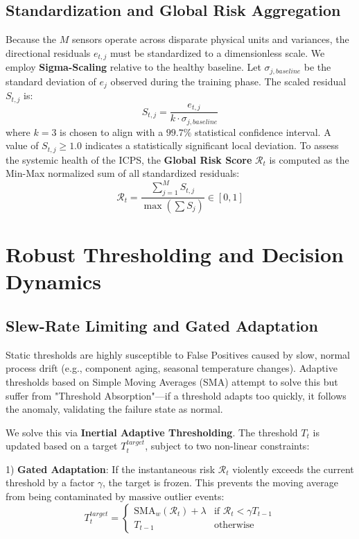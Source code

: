 \documentclass[journal]{IEEEtran}
\begin{document}
	\subsection{Standardization and Global Risk Aggregation}
	Because the $M$ sensors operate across disparate physical units and variances, the directional residuals $e_{t,j}$ must be standardized to a dimensionless scale. We employ \textbf{Sigma-Scaling} relative to the healthy baseline. Let $\sigma_{j, baseline}$ be the standard deviation of $e_j$ observed during the training phase. The scaled residual $S_{t,j}$ is:
	\begin{equation}
		S_{t,j} = \frac{e_{t,j}}{k \cdot \sigma_{j, baseline}}
	\end{equation}
	where $k=3$ is chosen to align with a $99.7\%$ statistical confidence interval. A value of $S_{t,j} \ge 1.0$ indicates a statistically significant local deviation. To assess the systemic health of the ICPS, the \textbf{Global Risk Score} $\mathcal{R}_t$ is computed as the Min-Max normalized sum of all standardized residuals:
	\begin{equation}
		\mathcal{R}_t = \frac{\sum_{j=1}^M S_{t,j}}{\max(\sum S_{j})} \in [0, 1]
	\end{equation}
	
	\section{Robust Thresholding and Decision Dynamics}
	
	\subsection{Slew-Rate Limiting and Gated Adaptation}
	Static thresholds are highly susceptible to False Positives caused by slow, normal process drift (e.g., component aging, seasonal temperature changes). Adaptive thresholds based on Simple Moving Averages (SMA) attempt to solve this but suffer from "Threshold Absorption"—if a threshold adapts too quickly, it follows the anomaly, validating the failure state as normal.
	
	We solve this via \textbf{Inertial Adaptive Thresholding}. The threshold $T_t$ is updated based on a target $T^{target}_t$, subject to two non-linear constraints:
	
	1) \textbf{Gated Adaptation}: If the instantaneous risk $\mathcal{R}_t$ violently exceeds the current threshold by a factor $\gamma$, the target is frozen. This prevents the moving average from being contaminated by massive outlier events:
	\begin{equation}
		T^{target}_t = 
		\begin{cases} 
			\text{SMA}_w(\mathcal{R}_t) + \lambda & \text{if } \mathcal{R}_t < \gamma T_{t-1} \\
			T_{t-1} & \text{otherwise}
		\end{cases}
	\end{equation}
	
\end{document}
